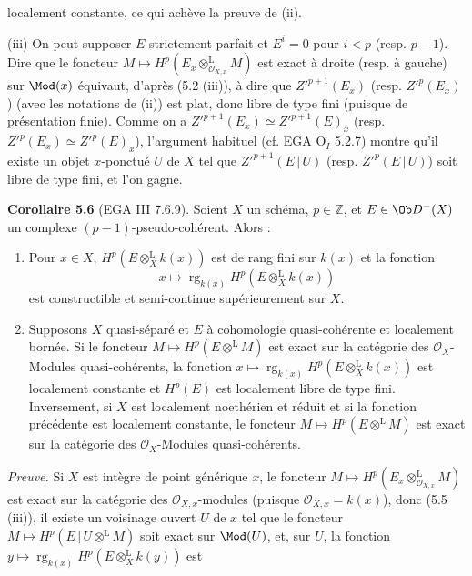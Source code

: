 localement constante, ce qui achève la preuve de (ii).

(iii) On peut supposer \(E\) strictement parfait et \(E^i=0\) pour \(i<p\) (resp. \(p-1\)). Dire que le foncteur \(M\mapsto H^p(E_x\otimes_{\mathcal O_{X,x}}^{\mathrm L}M)\) est exact à droite (resp. à gauche) sur \(\Mod(x)\) équivaut, d'après (5.2 (iii)), à dire que \(Z'^{p+1}(E_x)\) (resp. \(Z'^p(E_x)\)) (avec les notations de (ii)) est plat, donc libre de type fini (puisque de présentation finie). Comme on a \(Z'^{p+1}(E_x)\simeq Z'^{p+1}(E)_x\) (resp. \(Z'^p(E_x)\simeq Z'^p(E)_x\)), l'argument habituel (cf. EGA \(\mathrm O_I\) 5.2.7) montre qu'il existe un objet \(x\)-ponctué \(U\) de \(X\) tel que \(Z'^{p+1}(E\,|\,U)\) (resp. \(Z'^p(E\,|\,U)\)) soit libre de type fini, et l'on gagne.

\textbf{Corollaire 5.6} (EGA III 7.6.9). Soient \(X\) un schéma, \(p\in\mathbb Z\), et \(E\in\Ob D^{-}(X)\) un complexe \((p-1)\)-pseudo-cohérent. Alors :
\begin{enumerate}[label=(\roman*)]
\item Pour \(x\in X\), \(H^p(E\otimes_X^{\mathrm L}k(x))\) est de rang fini sur \(k(x)\) et la fonction
\[
 x\longmapsto\operatorname{rg}_{k(x)}H^p(E\otimes_X^{\mathrm L}k(x))
\]
est constructible et semi-continue supérieurement sur \(X\).
\item Supposons \(X\) quasi-séparé et \(E\) à cohomologie quasi-cohérente et localement bornée. Si le foncteur \(M\mapsto H^p(E\otimes^{\mathrm L}M)\) est exact sur la catégorie des \(\mathcal O_X\)-Modules quasi-cohérents, la fonction \(x\mapsto\operatorname{rg}_{k(x)}H^p(E\otimes_X^{\mathrm L}k(x))\) est localement constante et \(H^p(E)\) est localement libre de type fini. Inversement, si \(X\) est localement noethérien et réduit et si la fonction précédente est localement constante, le foncteur \(M\mapsto H^p(E\otimes^{\mathrm L}M)\) est exact sur la catégorie des \(\mathcal O_X\)-Modules quasi-cohérents.
\end{enumerate}

\emph{Preuve.} Si \(X\) est intègre de point générique \(x\), le foncteur \(M\mapsto H^p(E_x\otimes_{\mathcal O_{X,x}}^{\mathrm L}M)\) est exact sur la catégorie des \(\mathcal O_{X,x}\)-modules (puisque \(\mathcal O_{X,x}=k(x)\)), donc (5.5 (iii)), il existe un voisinage ouvert \(U\) de \(x\) tel que le foncteur \(M\mapsto H^p(E\,|\,U\otimes^{\mathrm L}M)\) soit exact sur \(\Mod(U)\), et, sur \(U\), la fonction \(y\mapsto\operatorname{rg}_{k(x)}H^p(E\otimes_X^{\mathrm L}k(y))\) est
